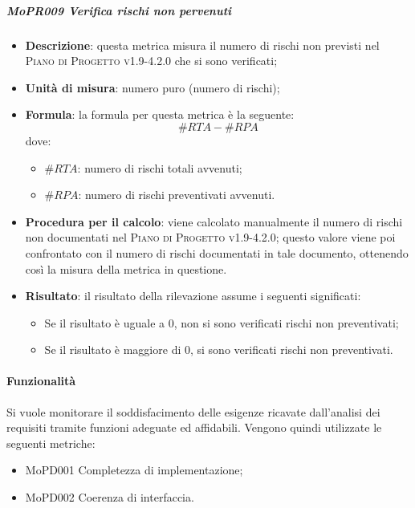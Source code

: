 \documentclass[../norme-di-progetto.tex]{subfiles}
\begin{document}
\subparagraph{MoPR009 Verifica rischi non pervenuti}
\begin{itemize}
  \item \textbf{Descrizione}: questa metrica misura il numero di rischi non previsti nel \textsc{Piano di Progetto v1.9-4.2.0} che si sono verificati;
  \item \textbf{Unità di misura}: numero puro (numero di rischi);
  \item \textbf{Formula}: la formula per questa metrica è la seguente:
  \begin{displaymath}
    \#RTA - \#RPA
  \end{displaymath}
  dove:
  \begin{itemize}
    \item $ \#RTA $: numero di rischi totali avvenuti;
    \item $ \#RPA $: numero di rischi preventivati avvenuti.
  \end{itemize}
    \item \textbf{Procedura per il calcolo}: viene calcolato manualmente il numero di rischi non documentati nel \textsc{Piano di Progetto v1.9-4.2.0}; questo valore viene poi confrontato con il numero di rischi documentati in tale documento, ottenendo così la misura della metrica in questione.
    \item \textbf{Risultato}: il risultato della rilevazione assume i seguenti significati:
    \begin{itemize}
      \item Se il risultato è uguale a 0, non si sono verificati rischi non preventivati;
      \item Se il risultato è maggiore di 0, si sono verificati rischi non preventivati.
    \end{itemize}
\end{itemize}


\paragraph{Funzionalità}
Si vuole monitorare il soddisfacimento delle esigenze ricavate dall'analisi dei requisiti tramite funzioni adeguate ed affidabili. Vengono quindi utilizzate le seguenti metriche:
\begin{itemize}
  \item MoPD001 Completezza di implementazione;
  \item MoPD002 Coerenza di interfaccia.
\end{itemize}
\end{document}
